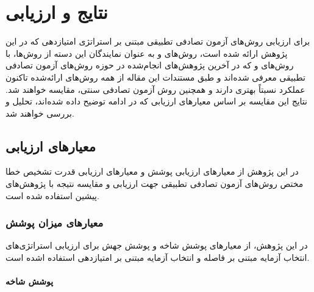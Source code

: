 \chapter{نتایج و ارزیابی}\label{chapter4}

برای ارزیابی روش‌های آزمون تصادفی تطبیقی مبتنی بر استراتژی امتیازدهی که در این پژوهش ارائه شده است، روش‌های  و  به عنوان نمایندگان این دسته از روش‌ها، با روش‌های  و  که در آخرین پژوهش‌های انجام‌شده در حوزه روش‌های آزمون تصادفی تطبیقی معرفی شده‌اند و طبق مستندات این مقاله از همه روش‌های ارائه‌شده تاکنون عملکرد نسبتاً بهتری دارند و همچنین روش آزمون تصادفی سنتی، مقایسه خواهند شد. نتایج این مقایسه بر اساس معیارهای ارزیابی که در ادامه توضیح داده شده‌اند، تحلیل و بررسی خواهند شد.

\section{معیارهای ارزیابی}

در این پژوهش از معیارهای ارزیابی پوشش و معیارهای ارزیابی قدرت تشخیص خطا مختص روش‌های آزمون تصادفی تطبیقی جهت ارزیابی و مقایسه نتیجه با پژوهش‌های پیشین استفاده شده است.

\subsection{معیارهای میزان پوشش}

در این پژوهش، از معیارهای پوشش شاخه و پوشش جهش برای ارزیابی استراتژی‌های انتخاب آزمایه مبتنی بر فاصله و انتخاب آزمایه مبتنی بر امتیازدهی استفاده اشده است.

\subsubsection{پوشش شاخه}

